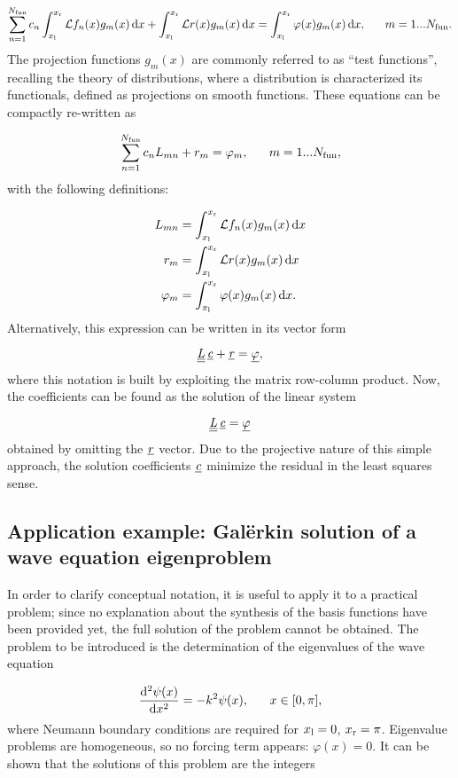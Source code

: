 \documentclass[a4paper,12pt]{article}
\begin{document}
\[
\sum_{n=1}^{N_{\mathrm{fun}}} c_n \int_{x_{\mathrm{l}}}^{x_{\mathrm{r}}} \mathcal{L} f_n(x) g_m(x) \, \mathrm{d} x + \int_{x_{\mathrm{l}}}^{x_{\mathrm{r}}} \mathcal{L} r(x) g_m(x) \, \mathrm{d} x = \int_{x_{\mathrm{l}}}^{x_{\mathrm{r}}} \varphi(x) g_m(x) \, \mathrm{d} x, ~~~~~ m=1 ... N_{\mathrm{fun}}.
\]
The projection functions $g_m(x)$ are commonly referred to as ``test functions'', recalling the theory of distributions, where a distribution is characterized its functionals, defined as projections on smooth functions. These equations can be compactly re-written as

\[
\sum_{n=1}^{N_{\mathrm{fun}}} c_n L_{mn} + r_m = \varphi_m, ~~~~~ m=1 ... N_{\mathrm{fun}},
\]
with the following definitions:

\begin{align*}
L_{mn} &= \int_{x_{\mathrm{l}}}^{x_{\mathrm{r}}} \mathcal{L} f_n(x) g_m(x) \, \mathrm{d} x \\
r_m &= \int_{x_{\mathrm{l}}}^{x_{\mathrm{r}}} \mathcal{L} r(x) g_m(x) \, \mathrm{d} x \\
\varphi_m &= \int_{x_{\mathrm{l}}}^{x_{\mathrm{r}}} \varphi(x) g_m(x) \, \mathrm{d} x.
\end{align*}
Alternatively, this expression can be written in its vector form

\[
\underline{\underline{\mathit{L}}} \, \underline{\mathit{c}} + \underline{\mathit{r}} = \underline{\varphi},
\]
where this notation is built by exploiting the matrix row-column product. Now, the coefficients can be found as the solution of the linear system

\[
\underline{\underline{\mathit{L}}} \, \underline{\mathit{c}} =  \underline{\varphi}
\]
obtained by omitting the $\underline{\mathit{r}}$ vector. Due to the projective nature of this simple approach, the solution coefficients $\underline{\mathit{c}}$ minimize the residual in the least squares sense.

\subsection{Application example: Gal\"{e}rkin solution of a wave equation eigenproblem}
\label{sect:examplegalerkin}

In order to clarify conceptual notation, it is useful to apply it to a practical problem; since no explanation about the synthesis of the basis functions have been provided yet, the full solution of the problem cannot be obtained. The problem to be introduced is the determination of the eigenvalues of the wave equation

\[
\frac{\mathrm{d}^2 \psi(x)}{\mathrm{d} x^2} = - k^2 \psi(x), ~~~~~ x \in [0, \pi],
\]
where Neumann boundary conditions are required for $x_{\mathrm{l}}=0$, $x_{\mathrm{r}}=\pi$. Eigenvalue problems are homogeneous, so no forcing term appears: $\varphi(x)=0$. It can be shown that the solutions of this problem are the integers
\end{document}
